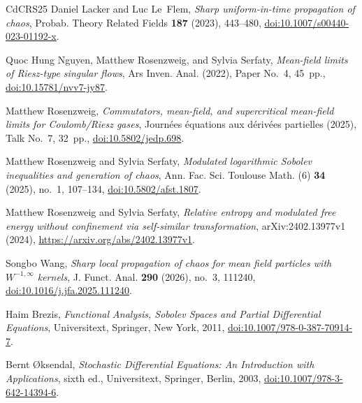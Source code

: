 \documentclass[11pt,reqno]{amsart}
\numberwithin{equation}{section}
\theoremstyle{plain}
\theoremstyle{remark}
\begin{document}
\begin{thebibliography}{CdCRS25}
Daniel Lacker and Luc Le~Flem, \emph{Sharp uniform-in-time propagation of
  chaos}, Probab. Theory Related Fields \textbf{187} (2023), 443--480,
  \href{https://doi.org/10.1007/s00440-023-01192-x}{doi:10.1007/s00440-023-01192-x}.



Quoc Hung Nguyen, Matthew Rosenzweig, and Sylvia Serfaty, \emph{Mean-field limits of Riesz-type singular flows}, Ars Inven. Anal. (2022), Paper No.~4, 45~pp.,
\href{https://doi.org/10.15781/nvv7-jy87}{doi:10.15781/nvv7-jy87}.

Matthew Rosenzweig, \emph{Commutators, mean-field, and supercritical mean-field limits for {Coulomb/Riesz} gases}, Journ\'ees \'equations aux d\'eriv\'ees partielles (2025), Talk No.~7, 32~pp.,
\href{https://doi.org/10.5802/jedp.698}{doi:10.5802/jedp.698}.

Matthew Rosenzweig and Sylvia Serfaty, \emph{Modulated logarithmic {S}obolev inequalities and generation of
  chaos}, Ann. Fac. Sci. Toulouse Math. (6) \textbf{34} (2025), no.~1,
  107--134, \href{https://doi.org/10.5802/afst.1807}{doi:10.5802/afst.1807}.



Matthew Rosenzweig and Sylvia Serfaty, \emph{Relative entropy and modulated free energy without confinement via self-similar transformation}, arXiv:2402.13977v1 (2024), \url{https://arxiv.org/abs/2402.13977v1}.

Songbo Wang, \emph{Sharp local propagation of chaos for mean field particles with {$W^{-1,\infty}$} kernels}, J. Funct. Anal. \textbf{290} (2026), no.~3, 111240,
  \href{https://doi.org/10.1016/j.jfa.2025.111240}{doi:10.1016/j.jfa.2025.111240}.


\begingroup
{}
Haim Brezis, \emph{Functional Analysis, Sobolev Spaces and Partial Differential Equations}, Universitext, Springer, New York, 2011, \href{https://doi.org/10.1007/978-0-387-70914-7}{doi:10.1007/978-0-387-70914-7}.

\par\endgroup

\begingroup
{}
Bernt \O ksendal, \emph{Stochastic Differential Equations: An Introduction with Applications}, sixth ed., Universitext, Springer, Berlin, 2003, \href{https://doi.org/10.1007/978-3-642-14394-6}{doi:10.1007/978-3-642-14394-6}.
\par\endgroup



\end{thebibliography}
\end{document}
